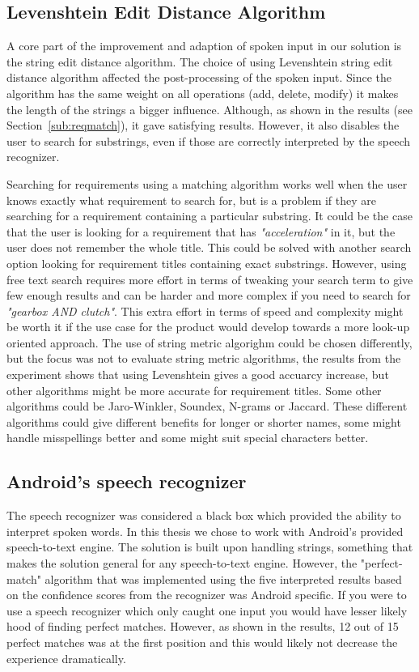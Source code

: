 \subsection{Levenshtein Edit Distance Algorithm}
\label{subsec:leved}
A core part of the improvement and adaption of spoken input in our solution is the string edit distance algorithm. The choice of using Levenshtein string edit distance algorithm affected the post-processing of the spoken input. Since the algorithm has the same weight on all operations (add, delete, modify) it makes the length of the strings a bigger influence. Although, as shown in the results (see Section~\ref{sub:reqmatch}), it gave satisfying results. However, it also disables the user to search for substrings, even if those are correctly interpreted by the speech recognizer. 

Searching for requirements using a matching algorithm works well when the user knows exactly what requirement to search for, but is a problem if they are searching for a requirement containing a particular substring. It could be the case that the user is looking for a requirement that has \emph{"acceleration"} in it, but the user does not remember the whole title. This could be solved with another search option looking for requirement titles containing exact substrings. However, using free text search requires more effort in terms of tweaking your search term to give few enough results and can be harder and more complex if you need to search for \emph{"gearbox AND clutch"}. This extra effort in terms of speed and complexity might be worth it if the use case for the product would develop towards a more look-up oriented approach. The use of string metric algorighm could be chosen differently, but the focus was not to evaluate string metric algorithms, the results from the experiment shows that using Levenshtein gives a good accuarcy increase, but other algorithms might be more accurate for requirement titles. Some other algorithms could be Jaro-Winkler, Soundex, N-grams or Jaccard. These different algorithms could give different benefits for longer or shorter names, some might handle misspellings better and some might suit special characters better.

\subsection{Android's speech recognizer}
The speech recognizer was considered a black box which provided the ability to interpret spoken words. In this thesis we chose to work with Android's provided speech-to-text engine. The solution is built upon handling strings, something that makes the solution general for any speech-to-text engine. However, the "perfect-match" algorithm that was implemented using the five interpreted results based on the confidence scores from the recognizer was Android specific. If you were to use a speech recognizer which only caught one input you would have lesser likely hood of finding perfect matches. However, as shown in the results, 12 out of 15 perfect matches was at the first position and this would likely not decrease the experience dramatically.

